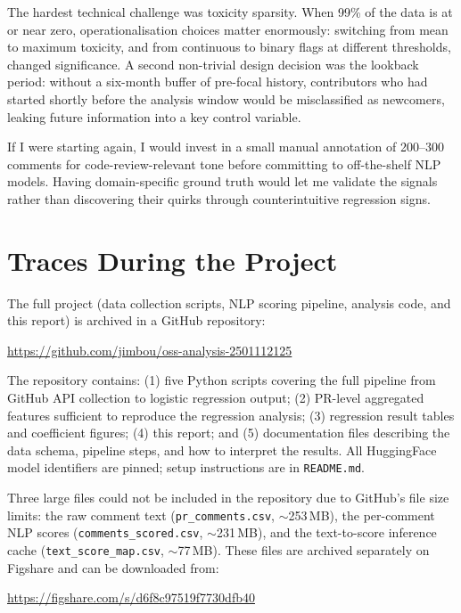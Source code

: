 \documentclass[12pt,a4paper]{article}
\begin{document}
The hardest technical challenge was toxicity sparsity. When 99\% of the data is at or near zero, operationalisation choices matter enormously: switching from mean to maximum toxicity, and from continuous to binary flags at different thresholds, changed significance. A second non-trivial design decision was the lookback period: without a six-month buffer of pre-focal history, contributors who had started shortly before the analysis window would be misclassified as newcomers, leaking future information into a key control variable.

If I were starting again, I would invest in a small manual annotation of 200--300 comments for code-review-relevant tone before committing to off-the-shelf NLP models. Having domain-specific ground truth would let me validate the signals rather than discovering their quirks through counterintuitive regression signs.

\section{Traces During the Project}

The full project (data collection scripts, NLP scoring pipeline, analysis code, and this report) is archived in a GitHub repository:

\begin{center}
\url{https://github.com/jimbou/oss-analysis-2501112125}
\end{center}

The repository contains: (1) five Python scripts covering the full pipeline from GitHub API collection to logistic regression output; (2) PR-level aggregated features sufficient to reproduce the regression analysis; (3) regression result tables and coefficient figures; (4) this report; and (5) documentation files describing the data schema, pipeline steps, and how to interpret the results. All HuggingFace model identifiers are pinned; setup instructions are in \texttt{README.md}.

Three large files could not be included in the repository due to GitHub's file size limits: the raw comment text (\texttt{pr\_comments.csv}, $\sim$253\,MB), the per-comment NLP scores (\texttt{comments\_scored.csv}, $\sim$231\,MB), and the text-to-score inference cache (\texttt{text\_score\_map.csv}, $\sim$77\,MB). These files are archived separately on Figshare and can be downloaded from:

\begin{center}
\url{https://figshare.com/s/d6f8c97519f7730dfb40}
\end{center}
\end{document}
